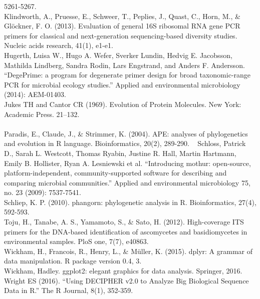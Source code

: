 \documentclass[11pt,]{article}
\begin{document}
5261-5267. ~\\
Klindworth, A., Pruesse, E., Schweer, T., Peplies, J., Quast, C., Horn,
M., \& Glöckner, F. O. (2013). Evaluation of general 16S ribosomal RNA
gene PCR primers for classical and next-generation sequencing-based
diversity studies. Nucleic acids research, 41(1), e1-e1. ~\\
Hugerth, Luisa W., Hugo A. Wefer, Sverker Lundin, Hedvig E. Jacobsson,
Mathilda Lindberg, Sandra Rodin, Lars Engstrand, and Anders F.
Andersson. ``DegePrime: a program for degenerate primer design for broad
taxonomic-range PCR for microbial ecology studies.'' Applied and
environmental microbiology (2014): AEM-01403. ~\\
Jukes TH and Cantor CR (1969). Evolution of Protein Molecules. New York:
Academic Press. 21--132.\\
\hspace*{0.333em}\\
Paradis, E., Claude, J., \& Strimmer, K. (2004). APE: analyses of
phylogenetics and evolution in R language. Bioinformatics, 20(2),
289-290. ~ Schloss, Patrick D., Sarah L. Westcott, Thomas Ryabin,
Justine R. Hall, Martin Hartmann, Emily B. Hollister, Ryan A. Lesniewski
et al. ``Introducing mothur: open-source, platform-independent,
community-supported software for describing and comparing microbial
communities.'' Applied and environmental microbiology 75, no. 23 (2009):
7537-7541. ~\\
Schliep, K. P. (2010). phangorn: phylogenetic analysis in R.
Bioinformatics, 27(4), 592-593. ~\\
Toju, H., Tanabe, A. S., Yamamoto, S., \& Sato, H. (2012). High-coverage
ITS primers for the DNA-based identification of ascomycetes and
basidiomycetes in environmental samples. PloS one, 7(7), e40863. ~\\
Wickham, H., Francois, R., Henry, L., \& Müller, K. (2015). dplyr: A
grammar of data manipulation. R package version 0.4, 3. ~\\
Wickham, Hadley. ggplot2: elegant graphics for data analysis. Springer,
2016. ~\\
Wright ES (2016). ``Using DECIPHER v2.0 to Analyze Big Biological
Sequence Data in R.'' The R Journal, 8(1), 352-359.




\newpage
\singlespacing 
\end{document}
